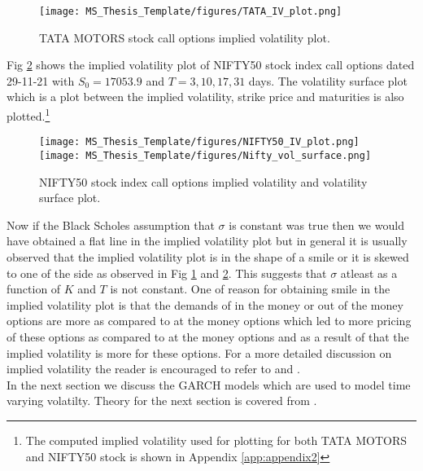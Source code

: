 \documentclass[12pt]{report}
\begin{document}
\begin{figure}[H]
    \centering
    \texttt{[image: MS\_Thesis\_Template/figures/TATA\_IV\_plot.png]}
    \caption{TATA MOTORS stock call options implied volatility plot.}
\label{tata}    
\end{figure}
Fig \ref{nifty} shows the implied volatility plot of NIFTY50 stock index call options dated 29-11-21 with $S_0=17053.9$ and $T=3,10,17,31$ days. The volatility surface plot which is a plot between the implied volatility, strike price and maturities is also plotted.\footnote{The computed implied volatility used for plotting for both TATA MOTORS and NIFTY50 stock is shown in Appendix \ref{app:appendix2}}


\begin{figure}[H]
    \centering
    \texttt{[image: MS\_Thesis\_Template/figures/NIFTY50\_IV\_plot.png]}
    \texttt{[image: MS\_Thesis\_Template/figures/Nifty\_vol\_surface.png]}
    \caption{NIFTY50 stock index call options implied volatility and volatility surface plot.}
\label{nifty}    
\end{figure}

Now if the Black Scholes assumption that $\sigma$ is constant was true then we would have obtained a flat line in the implied volatility plot but in general it is usually observed that the implied volatility plot is in the shape of a smile or it is skewed to one of the side as observed in Fig \ref{tata} and \ref{nifty}. This suggests that $\sigma$
atleast as a function of $K$ and $T$ is not constant. One of reason for obtaining smile in the implied volatility plot is that the demands of in the money or out of the money options are more as compared to at the money options which led to more pricing of these options as compared to at the money options and as a result of that the implied volatility is more for these options. For a more detailed discussion on implied volatility the reader is encouraged to refer to \cite{hull_2018} and \cite{papanicolaou_2019}.\\
In the next section we discuss the GARCH models which are used to model time varying volatilty. Theory for the next section is covered from \cite{tsay_2016}.
\end{document}
